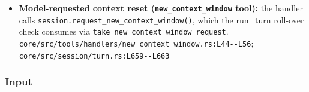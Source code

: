 \begin{itemize}
\item \textbf{Model-requested context reset (\texttt{new\_\allowbreak{}context\_\allowbreak{}window} tool):} the handler calls \texttt{session.\allowbreak{}request\_\allowbreak{}new\_\allowbreak{}context\_\allowbreak{}window(\allowbreak{})}, which the run\_turn roll-over check consumes via \texttt{take\_\allowbreak{}new\_\allowbreak{}context\_\allowbreak{}window\_\allowbreak{}request}. \texttt{core/\allowbreak{}src/\allowbreak{}tools/\allowbreak{}handlers/\allowbreak{}new\_\allowbreak{}context\_\allowbreak{}window.\allowbreak{}rs:\allowbreak{}L44-\allowbreak{}-\allowbreak{}L56}; \texttt{core/\allowbreak{}src/\allowbreak{}session/\allowbreak{}turn.\allowbreak{}rs:\allowbreak{}L659-\allowbreak{}-\allowbreak{}L663}
\end{itemize}

\subsubsection*{Input}
